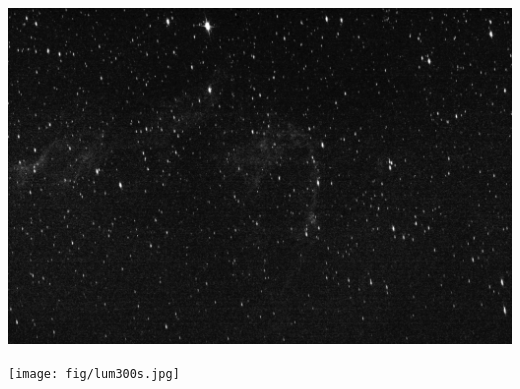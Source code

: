 \documentclass[12pt, a4paper]{article}
\begin{document}
\begin{center}
\begin{minipage}{0.48\linewidth}
\includegraphics[width=\linewidth]{fig/red300s.jpg}
\label{fig1}
\end{minipage}
\hfill
\begin{minipage}{0.49\linewidth}
\texttt{[image: fig/lum300s.jpg]}
\label{fig2}
\end{minipage}
\end{center}
\end{document}
